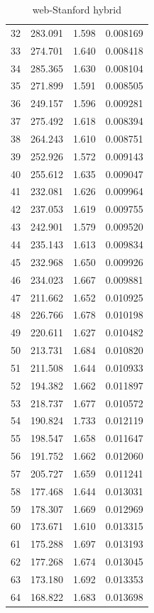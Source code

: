 \documentclass[10pt,twocolumn,letterpaper]{article}
\begin{document}
\begin{table}[h]
\begin{tabular}{@{}c|ccc@{}}
32 & 283.091 & 1.598 & 0.008169 \\
33 & 274.701 & 1.640 & 0.008418 \\
34 & 285.365 & 1.630 & 0.008104 \\
35 & 271.899 & 1.591 & 0.008505 \\
36 & 249.157 & 1.596 & 0.009281 \\
37 & 275.492 & 1.618 & 0.008394 \\
38 & 264.243 & 1.610 & 0.008751 \\
39 & 252.926 & 1.572 & 0.009143 \\
40 & 255.612 & 1.635 & 0.009047 \\
41 & 232.081 & 1.626 & 0.009964 \\
42 & 237.053 & 1.619 & 0.009755 \\
43 & 242.901 & 1.579 & 0.009520 \\
44 & 235.143 & 1.613 & 0.009834 \\
45 & 232.968 & 1.650 & 0.009926 \\
46 & 234.023 & 1.667 & 0.009881 \\
47 & 211.662 & 1.652 & 0.010925 \\
48 & 226.766 & 1.678 & 0.010198 \\
49 & 220.611 & 1.627 & 0.010482 \\
50 & 213.731 & 1.684 & 0.010820 \\
51 & 211.508 & 1.644 & 0.010933 \\
52 & 194.382 & 1.662 & 0.011897 \\
53 & 218.737 & 1.677 & 0.010572 \\
54 & 190.824 & 1.733 & 0.012119 \\
55 & 198.547 & 1.658 & 0.011647 \\
56 & 191.752 & 1.662 & 0.012060 \\
57 & 205.727 & 1.659 & 0.011241 \\
58 & 177.468 & 1.644 & 0.013031 \\
59 & 178.307 & 1.669 & 0.012969 \\
60 & 173.671 & 1.610 & 0.013315 \\
61 & 175.288 & 1.697 & 0.013193 \\
62 & 177.268 & 1.674 & 0.013045 \\
63 & 173.180 & 1.692 & 0.013353 \\
64 & 168.822 & 1.683 & 0.013698 \\
\bottomrule
\end{tabular}
\caption{web-Stanford hybrid}
\end{table}
\end{document}
